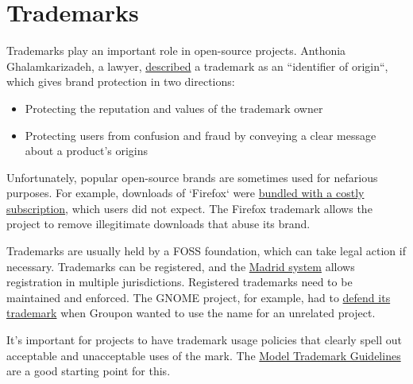 


\chapter{Trademarks}

Trademarks play an important role in open-source projects.  Anthonia Ghalamkarizadeh, a lawyer, \href{https://lwn.net/Articles/546678/}{described} a trademark as an ``identifier of origin``, which gives brand protection in two directions:

\begin{itemize}

\item Protecting the reputation and values of the trademark owner

\item Protecting users from confusion and fraud by conveying a clear message about a product's origins

\end{itemize}

Unfortunately, popular open-source brands are sometimes used for nefarious purposes.  For example, downloads of `Firefox` were \href{https://lwn.net/Articles/546678/}{bundled with a costly subscription}, which users did not expect.  The Firefox trademark allows the project to remove illegitimate downloads that abuse its brand.

Trademarks are usually held by a FOSS foundation, which can take legal action if necessary.  Trademarks can be registered, and the \href{https://en.wikipedia.org/wiki/Madrid_system}{Madrid system} allows registration in multiple jurisdictions.  Registered trademarks need to be maintained and enforced.  The GNOME project, for example, had to \href{https://lwn.net/Articles/654124/}{defend its trademark} when Groupon wanted to use the name for an unrelated project.

It's important for projects to have trademark usage policies that clearly spell out acceptable and unacceptable uses of the mark.  The \href{http://modeltrademarkguidelines.org/}{Model Trademark Guidelines} are a good starting point for this.

